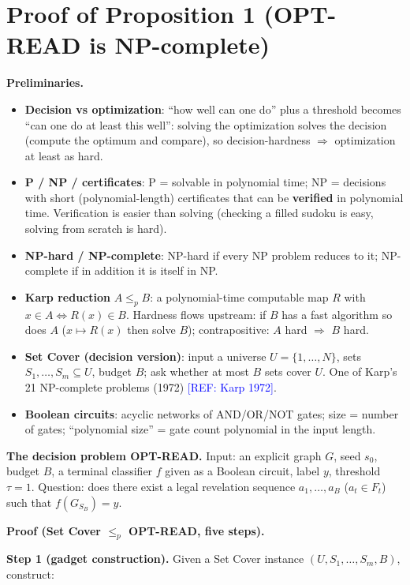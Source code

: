\documentclass{article}
\newcommand{\refadd}[1]{\textcolor{blue}{[REF: #1]}}
\begin{document}
\section{Proof of Proposition 1 (OPT-READ is NP-complete)}
\label{app:prop1}

\textbf{Preliminaries.}
\begin{itemize}
\item \textbf{Decision vs optimization}: ``how well can one do'' plus a threshold becomes ``can one do at least this well'': solving the optimization solves the decision (compute the optimum and compare), so decision-hardness $\Rightarrow$ optimization at least as hard.
\item \textbf{P / NP / certificates}: P = solvable in polynomial time; NP = decisions with short (polynomial-length) certificates that can be \textbf{verified} in polynomial time. Verification is easier than solving (checking a filled sudoku is easy, solving from scratch is hard).
\item \textbf{NP-hard / NP-complete}: NP-hard if every NP problem reduces to it; NP-complete if in addition it is itself in NP.
\item \textbf{Karp reduction} $A\le_p B$: a polynomial-time computable map $R$ with $x\in A\iff R(x)\in B$. Hardness flows upstream: if $B$ has a fast algorithm so does $A$ ($x\mapsto R(x)$ then solve $B$); contrapositive: $A$ hard $\Rightarrow$ $B$ hard.
\item \textbf{Set Cover (decision version)}: input a universe $U=\{1,\dots,N\}$, sets $S_1,\dots,S_m\subseteq U$, budget $B$; ask whether at most $B$ sets cover $U$. One of Karp's 21 NP-complete problems (1972) \refadd{Karp 1972}.
\item \textbf{Boolean circuits}: acyclic networks of AND/OR/NOT gates; size = number of gates; ``polynomial size'' = gate count polynomial in the input length.
\end{itemize}

\textbf{The decision problem OPT-READ.} Input: an explicit graph $G$, seed $s_0$, budget $B$, a terminal classifier $f$ given as a Boolean circuit, label $y$, threshold $\tau=1$. Question: does there exist a legal revelation sequence $a_1,\dots,a_B$ ($a_t\in F_t$) such that $f(G_{S_B})=y$.

\textbf{Proof (Set Cover $\le_p$ OPT-READ, five steps).}

\textbf{Step 1 (gadget construction).} Given a Set Cover instance $(U,S_1,\dots,S_m,B)$, construct:
\end{document}
